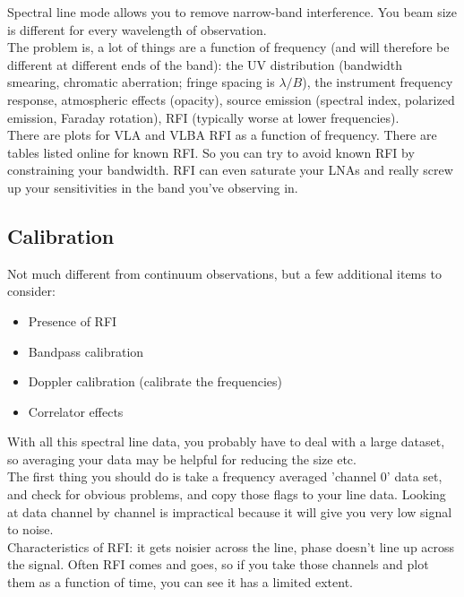 \documentclass[a4paper]{article}
\begin{document}
Spectral line mode allows you to remove narrow-band interference. You beam size is different for every wavelength of observation. \\

The problem is, a lot of things are a function of frequency (and will therefore be different at different ends of the band): the UV distribution (bandwidth smearing, chromatic aberration; fringe spacing is $\lambda/B$), the instrument frequency response, atmospheric effects (opacity), source emission (spectral index, polarized emission, Faraday rotation), RFI (typically worse at lower frequencies). \\

There are plots for VLA and VLBA RFI as a function of frequency. There are tables listed online for known RFI. So you can try to avoid known RFI by constraining your bandwidth. RFI can even saturate your LNAs and really screw up your sensitivities in the band you've observing in. 

\subsection{Calibration}

Not much different from continuum observations, but a few additional items to consider:
\begin{itemize}
\item Presence of RFI
\item Bandpass calibration
\item Doppler calibration (calibrate the frequencies)
\item Correlator effects
\end{itemize}

With all this spectral line data, you probably have to deal with a large dataset, so averaging your data may be helpful for reducing the size etc. \\

The first thing you should do is take a frequency averaged 'channel 0' data set, and check for obvious problems, and copy those flags to your line data. Looking at data channel by channel is impractical because it will give you very low signal to noise. \\

Characteristics of RFI: it gets noisier across the line, phase doesn't line up across the signal. Often RFI comes and goes, so if you take those channels and plot them as a function of time, you can see it has a limited extent. \\
\end{document}
